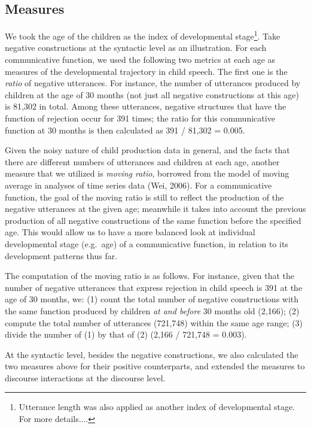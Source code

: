 \documentclass[
  english,
  man,floatsintext]{apa6}
\begin{document}
\hypertarget{measures}{%
\subsection{Measures}\label{measures}}

We took the age of the children as the index of developmental stage\footnote{Utterance length was also applied as another index of developmental stage. For more details....}. Take negative constructions at the syntactic level as an illustration. For each communicative function, we used the following two metrics at each age as measures of the developmental trajectory in child speech. The first one is the \emph{ratio} of negative utterances. For instance, the number of utterances produced by children at the age of 30 months (not just all negative constructions at this age) is 81,302 in total. Among these utterances, negative structures that have the function of rejection occur for 391 times; the ratio for this communicative function at 30 months is then calculated as 391 / 81,302 = 0.005.

Given the noisy nature of child production data in general, and the facts that there are different numbers of utterances and children at each age, another measure that we utilized is \emph{moving ratio}, borrowed from the model of moving average in analyses of time series data (Wei, 2006). For a communicative function, the goal of the moving ratio is still to reflect the production of the negative utterances at the given age; meanwhile it takes into account the previous production of all negative constructions of the same function before the specified age. This would allow us to have a more balanced look at individual developmental stage (e.g.~age) of a communicative function, in relation to its development patterns thus far.

The computation of the moving ratio is as follows. For instance, given that the number of negative utterances that express rejection in child speech is 391 at the age of 30 months, we: (1) count the total number of negative constructions with the same function produced by children \emph{at and before} 30 months old (2,166); (2) compute the total number of utterances (721,748) within the same age range; (3) divide the number of (1) by that of (2) (2,166 / 721,748 = 0.003).

At the syntactic level, besides the negative constructions, we also calculated the two measures above for their positive counterparts, and extended the measures to discourse interactions at the discourse level.
\end{document}
